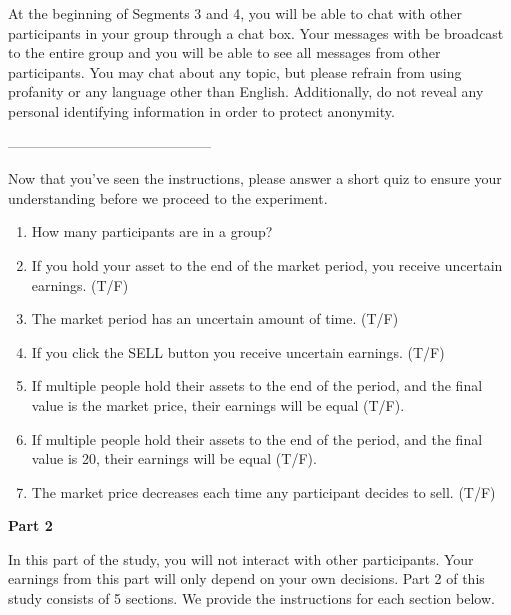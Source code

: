 \documentclass[thesis]{uathesis}
\begin{document}
\begin{body}
\begin{appendices}
\begin{itemize}
\end{itemize}



At the beginning of Segments 3 and 4, you will be able to chat with other participants in your group through a chat box.  Your messages with be broadcast to the entire group and you will be able to see all messages from other participants. You may chat about any topic, but please refrain from using profanity or any language other than English. Additionally, do not reveal any personal identifying information in order to protect anonymity.


\vspace{0.2in}
\begin{center}
--------------------------------------------
\end{center}
\vspace{0.2in}


Now that you've seen the instructions, please answer a short quiz to ensure your understanding before we proceed to the experiment.

\begin{enumerate}
    \item  How many participants are in a group?
    \item  If you hold your asset to the end of the market period, you receive uncertain earnings. (T/F)
    \item  The market period has an uncertain amount of time. (T/F)
    \item  If you click the SELL button you receive  uncertain earnings. (T/F)
    \item  If multiple people hold their assets to the end of the period, and the final value is the market price, their earnings will be equal (T/F).
    \item  If multiple people hold their assets to the end of the period, and the final value is 20, their earnings will be equal (T/F).
    \item  The market price decreases each time any participant decides to sell. (T/F)
\end{enumerate}


\noindent\textbf{Part 2}

\medskip

In this part of the study, you will not interact with other participants. Your earnings from this part will only depend on your own decisions. Part 2 of this study consists of 5 sections. We provide the instructions for each section below.




\end{appendices}
\end{body}
\end{document}
